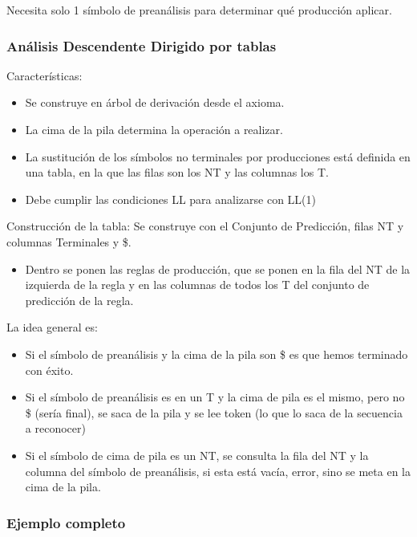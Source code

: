 \documentclass[12pt, twoside, openright]{report} %
\begin{document}
Necesita solo 1 símbolo de preanálisis para determinar qué producción
aplicar.


\subsubsection{Análisis Descendente Dirigido por tablas}

Características:

\begin{itemize}

\item
  Se construye en árbol de derivación desde el axioma.
\item
  La cima de la pila determina la operación a realizar.
\item
  La sustitución de los símbolos no terminales por producciones está
  definida en una tabla, en la que las filas son los NT y las columnas
  los T.
\item
  Debe cumplir las condiciones LL para analizarse con LL(1)
\end{itemize}

Construcción de la tabla: Se construye con el Conjunto de Predicción,
filas NT y columnas Terminales y \$.

\begin{itemize}

\item
  Dentro se ponen las reglas de producción, que se ponen en la fila del
  NT de la izquierda de la regla y en las columnas de todos los T del
  conjunto de predicción de la regla.
\end{itemize}

La idea general es:

\begin{itemize}

\item
  Si el símbolo de preanálisis y la cima de la pila son \$ es que hemos
  terminado con éxito.
\item
  Si el símbolo de preanálisis es en un T y la cima de pila es el mismo,
  pero no \$ (sería final), se saca de la pila y se lee token (lo que lo
  saca de la secuencia a reconocer)
\item
  Si el símbolo de cima de pila es un NT, se consulta la fila del NT y
  la columna del símbolo de preanálisis, si esta está vacía, error, sino
  se meta en la cima de la pila.
\end{itemize}

\pagebreak

\subsubsection{Ejemplo completo}
\end{document}
